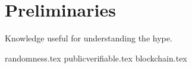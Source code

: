 \section{Preliminaries}\label{sec:preliminaries}
Knowledge useful for understanding the hype.

{randomness.tex}
{publicverifiable.tex}
{blockchain.tex}

